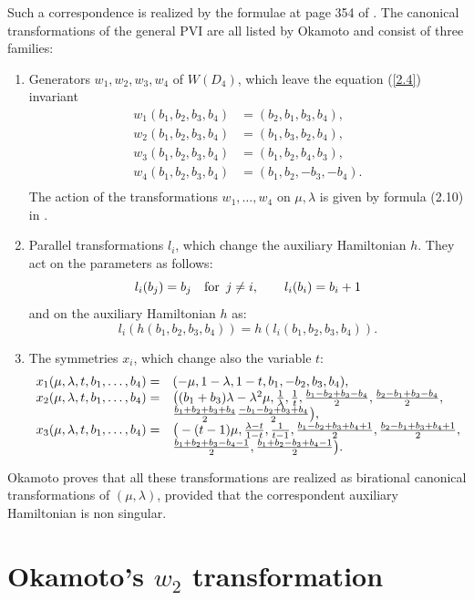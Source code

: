 \documentclass[12pt]{article}
\theoremstyle{definition}
\theoremstyle{theorem}
\begin{document}
Such a correspondence is realized by the formulae at page 354 of 
\cite{Ok2}. The
canonical transformations of the general PVI are all listed by Okamoto and 
consist of three families:
\begin{enumerate}
\item Generators $w_1,w_2,w_3,w_4$ of $W(D_4)$, which leave the equation 
(\ref{2.4}) invariant
$$
\begin{array}{ll}
w_1(b_1, b_2, b_3, b_4)&=(b_2, b_1, b_3, b_4),\\
w_2(b_1, b_2, b_3, b_4)&=(b_1, b_3, b_2, b_4),\\
w_3(b_1, b_2, b_3, b_4)&=(b_1, b_2, b_4, b_3),\\ 
w_4(b_1, b_2, b_3, b_4)&=(b_1, b_2, -b_3, -b_4).\\
\end{array}
$$
The action of the transformations $w_1,\dots,w_4$ on $\mu,\lambda$ is given 
by formula (2.10) in \cite{Ok2}.
\item Parallel transformations $l_i$, which change the auxiliary 
Hamiltonian $h$.
They act on the parameters as follows:
$$
l_i(b_j)=b_j\quad\hbox{for }\, j\neq i,\qquad l_i(b_i)=b_i+1
$$
and on the auxiliary Hamiltonian $h$ as:
$$
l_i(h(b_1, b_2, b_3, b_4))=h(l_i(b_1, b_2, b_3, b_4)).
$$
\item The symmetries $x_i$, which change also the variable $t$:
$$
\begin{array}{ll}
x_1(\mu,\lambda,t,b_1, \dots, b_4)=
&(-\mu,1-\lambda,1-t,b_1,-b_2,b_3,b_4),\\
x_2(\mu,\lambda,t,b_1, \dots, b_4)=
&\big((b_1+b_3) \lambda-\lambda^2 \mu,{1\over \lambda},{1\over t},
{b_1-b_2+b_3-b_4\over2},{b_2-b_1+b_3-b_4\over2},\\
&{b_1+b_2+b_3+b_4\over2}{-b_1-b_2+b_3+b_4\over2}\big),\\
x_3(\mu,\lambda,t,b_1,\dots, b_4)
=&\big(-(t-1)\mu,{\lambda-t\over 1-t},{1\over t-1},
{b_1-b_2+b_3+b_4+1\over2},{b_2-b_1+b_3+b_4+1\over2},\\
&{b_1+b_2+b_3-b_4-1\over2},{b_1+b_2-b_3+b_4-1\over2}
\big).\\ \end{array}
$$
\end{enumerate}
Okamoto proves that all these transformations are realized as birational 
canonical
transformations of $(\mu,\lambda)$, provided that the correspondent auxiliary
Hamiltonian is non singular. 


\section{Okamoto's $w_2$ transformation} 
\end{document}
